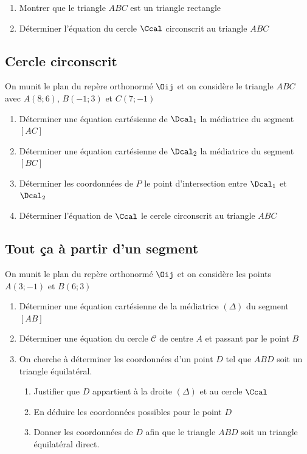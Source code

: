 \documentclass[oneside,12pt]{book}          %
\begin{document}
\begin{enumerate}
    \item Montrer que le triangle $ABC$ est un triangle rectangle
    \item Déterminer l'équation du cercle $\Ccal$ circonscrit au triangle $ABC$
\end{enumerate}



\subsection{Cercle circonscrit}
On munit le plan du repère orthonormé $\Oij$ et on considère le triangle $ABC$ avec $A(8;6)$, $B(-1;3)$ et $C(7;-1)$
\begin{enumerate}
	\item Déterminer une équation cartésienne de $\Dcal_1$ la médiatrice du segment $[AC]$
	\item Déterminer une équation cartésienne de $\Dcal_2$ la médiatrice du segment $[BC]$
	\item Déterminer les coordonnées de $P$ le point d'intersection entre $\Dcal_1$ et $\Dcal_2$
	\item Déterminer l'équation de $\Ccal$ le cercle circonscrit au triangle $ABC$
\end{enumerate}



\subsection{Tout ça à partir d'un segment}
On munit le plan du repère orthonormé $\Oij$ et on considère les points $A(3;-1)$ et $B(6;3)$
\begin{enumerate}
    \item Déterminer une équation cartésienne de la médiatrice $(\Delta)$ du segment $[AB]$
    \item Déterminer une équation du cercle $\mathscr{C}$ de centre $A$ et passant par le point $B$
    \item On cherche à déterminer les coordonnées d'un point $D$ tel que $ABD$ soit un triangle équilatéral.
    \begin{enumerate}
    	\item Justifier que $D$ appartient à la droite $(\Delta)$ et au cercle $\Ccal$
    	\item En déduire les coordonnées possibles pour le point $D$
    	\item Donner les coordonnées de $D$ afin que le triangle $ABD$ soit un triangle équilatéral direct.
    \end{enumerate}
\end{enumerate}
\end{document}
